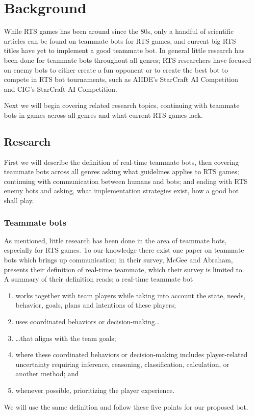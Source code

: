 \chapter{Background} While RTS games has been around since the 80s\cite{adams06, rtsHistory}, only a
handful of scientific articles can be found on teammate bots for RTS games, and current big RTS
titles have yet to implement a good teammate bot. In general little research has been done for
teammate bots throughout all genres; RTS researchers have focused on enemy bots to either create a
fun opponent\cite{hagelback09} or to create the best bot to compete in RTS bot tournaments, such as
AIIDE's StarCraft AI Competition\cite{scaiide} and CIG's StarCraft AI Competition\cite{sccig}.

Next we will begin covering related research topics, continuing with teammate bots in games across
all genres and what current RTS games lack.

\section{Research}
First we will describe the definition of real-time teammate bots, then covering teammate bots across
all genres asking what guidelines applies to RTS games; continuing with communication between humans
and bots; and ending with RTS enemy bots and asking, what implementation strategies exist, how a good
bot shall play.

\subsection{Teammate bots} \label{sec:teammate_bots} As mentioned, little
research has been done in the area of teammate bots, especially for RTS games. To our knowledge
there exist one paper on teammate bots\cite{mcgee10} which brings up communication; in their survey, McGee and Abraham, presents
their definition of real-time teammate, which their survey is limited to. A summary of their
definition reads; a real-time teammate bot
\begin{enumerate}
	\item works together with team players while taking into account the state, needs, behavior,
	  goals, plans and intentions of these players;
	\item uses coordinated behaviors or decision-making\ldots
	\item {\ldots}that aligns with the team goals;
	\item where these coordinated behaviors or decision-making includes player-related uncertainty
	  requiring inference, reasoning, classification, calculation, or another method; and
	\item whenever possible, prioritizing the player experience.
\end{enumerate}
We will use the same definition and follow these five points for our proposed bot.

